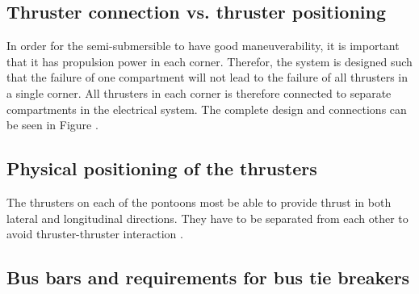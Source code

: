 \subsection*{Thruster connection vs. thruster positioning}
In order for the semi-submersible to have good maneuverability, it is important that it has propulsion power in each corner. Therefor, the system is designed such that the failure of one compartment will not lead to the failure of all thrusters in a single corner. All thrusters in each corner is therefore connected to separate compartments in the electrical system. The complete design and connections can be seen in Figure .

\subsection*{Physical positioning of the thrusters}
The thrusters on each of the pontoons most be able to provide thrust in both lateral and longitudinal directions. They have to be separated from each other to avoid thruster-thruster interaction \cite{MarReg1Comp} . 

\subsection*{Bus bars and requirements for bus tie breakers}
